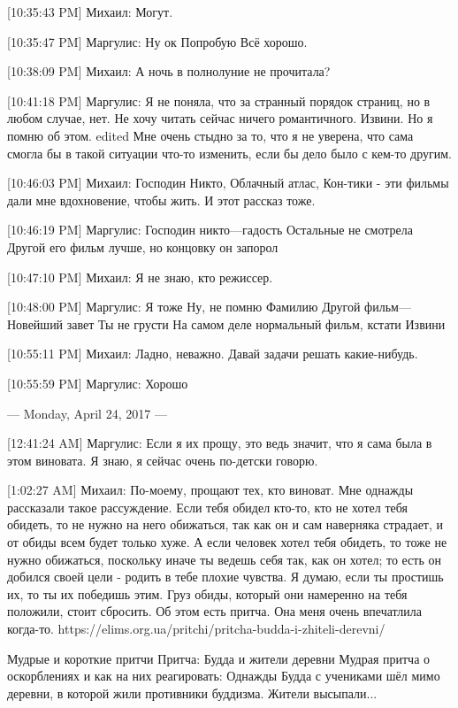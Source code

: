 \documentclass{article}
\begin{document}
[10:35:43 PM] Михаил:
Могут.

[10:35:47 PM] Маргулис:
Ну ок
 Попробую
 Всё хорошо.

[10:38:09 PM] Михаил:
А ночь в полнолуние не прочитала?

[10:41:18 PM] Маргулис:
Я не поняла, что за странный порядок страниц, но в любом случае, нет. Не хочу читать сейчас ничего романтичного. Извини. Но я помню об этом.
edited 
Мне очень стыдно за то, что я не уверена, что сама смогла бы в такой ситуации что-то изменить, если бы дело было с кем-то другим.

[10:46:03 PM] Михаил:
Господин Никто, Облачный атлас, Кон-тики - эти фильмы дали мне вдохновение, чтобы жить. И этот рассказ тоже.

[10:46:19 PM] Маргулис:
Господин никто—гадость
 Остальные не смотрела
 Другой его фильм лучше, но концовку он запорол

[10:47:10 PM] Михаил:
Я не знаю, кто режиссер.

[10:48:00 PM] Маргулис:
Я тоже
 Ну, не помню
 Фамилию
 Другой фильм—Новейший завет
 Ты не грусти
 На самом деле нормальный фильм, кстати
 Извини

[10:55:11 PM] Михаил:
Ладно, неважно. Давай задачи решать какие-нибудь.

[10:55:59 PM] Маргулис:
Хорошо

--- Monday, April 24, 2017 ---

[12:41:24 AM] Маргулис:
Если я их прощу, это ведь значит, что я сама была в этом виновата. Я знаю, я сейчас очень по-детски говорю.

[1:02:27 AM] Михаил:
По-моему, прощают тех, кто виноват.
 Мне однажды рассказали такое рассуждение. Если тебя обидел кто-то, кто не хотел тебя обидеть, то не нужно на него обижаться, так как он и сам наверняка страдает, и от обиды всем будет только хуже. А если человек хотел тебя обидеть, то тоже не нужно обижаться, поскольку иначе ты ведешь себя так, как он хотел; то есть он добился своей цели - родить в тебе плохие чувства.
 Я думаю, если ты простишь их, то ты их победишь этим. Груз обиды, который они намеренно на тебя положили, стоит сбросить.
 Об этом есть притча. Она меня очень впечатлила когда-то. https://elims.org.ua/pritchi/pritcha-budda-i-zhiteli-derevni/

Мудрые и короткие притчи
Притча: Будда и жители деревни
Мудрая притча о оскорблениях и как на них реагировать: Однажды Будда с учениками шёл мимо деревни, в которой жили противники буддизма. Жители высыпали...
\end{document}
